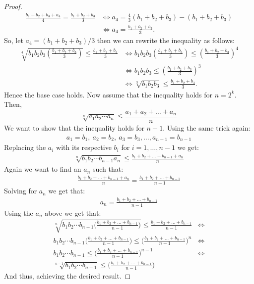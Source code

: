 \documentclass[12pt]{extreport}
\begin{document}
\begin{flushleft}
\begin{proof}
\begin{align*}
\frac{b_1 + b_2 + b_3 + a_4}{4} = \frac{b_1 + b_2 + b_3}{3} &\iff a_4 = \frac{4}{3}(b_1 + b_2 + b_3) - (b_1 + b_2 + b_3) \\&\iff a_4 = 	\frac{b_1 + b_2 + b_3}{3}.
\end{align*}
So, let $a_4 = (b_1 + b_2 + b_3)/3$ then we can rewrite the inequality as follows:
\begin{align*}
\sqrt[4]{b_1b_2b_3(\frac{b_1 + b_2 + b_3}{3})} \leq \frac{b_1 + b_2 + b_3}{3} &\iff b_1b_2b_3(\frac{b_1 + b_2 + b_3}{3}) \leq (\frac{b_1 + b_2 + b_3}{3})^4 \\&\iff b_1b_2b_3 \leq (\frac{b_1 + b_2 + b_3}{3})^3 \\&\iff \sqrt[3]{b_1b_2b_3} \leq \frac{b_1 + b_2 + b_3}{3}.
\end{align*}
Hence the base case holds. Now assume that the inequality holds for $n = 2^k$. Then, $$\sqrt[n]{a_1a_2\cdots a_n} \leq \frac{a_1 + a_2 + \ldots + a_n}{n} $$ We want to show that the inequality holds for $n-1$. Using the same trick again:
\begin{align*}
a_1 = b_1, \ a_2 = b_2, \ a_3 = b_3,\ldots, a_{n-1} = b_{n-1}
\end{align*}
Replacing the $a_i$ with its respective $b_i$ for $i = 1,\ldots, n-1$ we get:
\begin{align*}
\sqrt[n]{b_1b_2\cdots b_{n-1}a_n} \leq \frac{b_1 + b_2 + \ldots + b_{n-1} + a_n}{n}
\end{align*}
Again we want to find an $a_n$ such that:
\begin{align*}
\frac{b_1 + b_2 + \ldots + b_{n-1} + a_n}{n} = \frac{b_1 + b_2 + \ldots + b_{n-1}}{n-1}
\end{align*}
Solving for $a_n$ we get that:
\begin{align*}
a_n = \frac{b_1 + b_2 + \ldots + b_{n-1}}{n-1}
\end{align*}
Using the $a_n$ above we get that:
\begin{align*}
\sqrt[n]{b_1b_2\cdots b_{n-1} \big(\frac{b_1 + b_2 + \ldots + b_{n-1}}{n-1}\big)} \leq \frac{b_1 + b_2 + \ldots + b_{n-1}}{n-1} &\iff\\
b_1b_2\cdots b_{n-1} \big(\frac{b_1 + b_2 + \ldots + b_{n-1}}{n-1}\big) \leq \big(\frac{b_1 + b_2 + \ldots + b_{n-1}}{n-1}\big)^n &\iff\\
b_1b_2\cdots b_{n-1} \leq \big(\frac{b_1 + b_2 + \ldots + b_{n-1}}{n-1}\big)^{n-1} &\iff\\
\sqrt[n-1]{b_1b_2\cdots b_{n-1}} \leq \big(\frac{b_1 + b_2 + \ldots + b_{n-1}}{n-1}\big)
\end{align*}
And thus, achieving the desired result.
\end{proof}
\end{flushleft}
\end{document}
